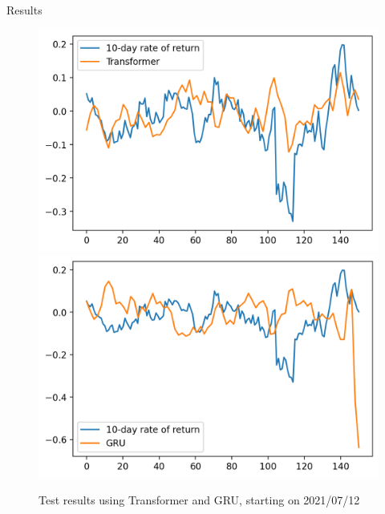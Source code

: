 \documentclass[final]{beamer}
\newlength{\colwidth}
\begin{document}
\begin{frame}[t]
\begin{columns}[t]
\begin{column}{\colwidth}
\begin{exampleblock}{Results}
\begin{figure}
  \includegraphics[scale=1]{outft.png}
  \hspace{1in}
  \includegraphics[scale=1]{outputfg.png}
  \caption{Test results using Transformer and GRU, starting on 2021/07/12}
  

\end{figure}
\end{exampleblock}
\end{column}
\end{columns}
\end{frame}
\end{document}
